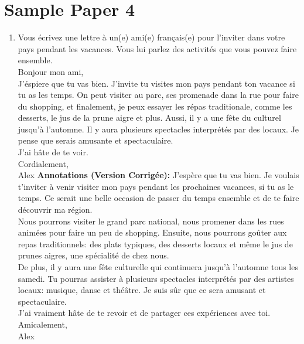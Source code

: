 \documentclass{book}
\begin{document}
    \section{Sample Paper 4}
        \begin{enumerate}
            \item Vous écrivez une lettre à un(e) ami(e) français(e) pour l'inviter dans votre pays pendant les vacances. Vous lui parlez des activités que vous pouvez faire ensemble. \\
                    Bonjour mon ami, \\
                    J'éspiere que tu vas bien. J'invite tu visites mon pays pendant ton vacance si tu as les temps. On peut visiter au parc, ses promenade dans la rue pour faire du shopping, et finalement, 
                    je peux essayer les répas traditionale, comme les desserts, le jus de la prune aigre et plus. Aussi, il y a une fête du culturel jusqu'à l'automne. Il y aura plusieurs spectacles interprétés par des locaux. 
                    Je pense que serais amusante et spectaculaire. \\
                    J'ai hâte de te voir. \\
                    Cordialement, \\
                    Alex
                    \medskip 
                    \textbf{Annotations (Version Corrigée):}
                    J'espère que tu vas bien. Je voulais t'inviter à venir visiter mon pays pendant les prochaines vacances, si tu as le temps. Ce serait une belle occasion de passer du temps ensemble et de te faire découvrir ma région. \\
                    Nous pourrons visiter le grand parc national, nous promener dans les rues animées pour faire un peu de shopping. Ensuite, nous pourrons goûter aux repas traditionnels: des plats typiques, des desserts locaux et même le jus de prunes aigres, une spécialité de chez nous. \\
                    De plus, il y aura une fête culturelle qui continuera jusqu'à l'automne tous les samedi. Tu pourras assister à plusieurs spectacles interprétés par des artistes locaux: musique, danse et théâtre. Je suis sûr que ce sera amusant et spectaculaire. \\
                    J'ai vraiment hâte de te revoir et de partager ces expériences avec toi. \\
                    Amicalement, \\
                    Alex
        \end{enumerate}
\end{document}

